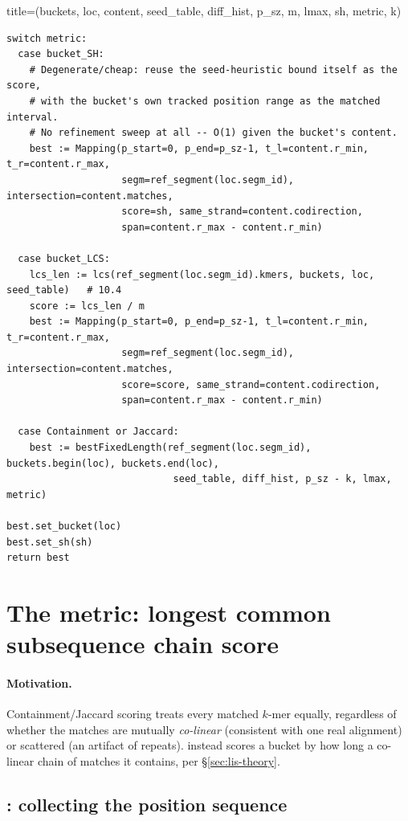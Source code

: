 \begin{algobox}{title={(buckets, loc, content, seed\_table, diff\_hist, p\_sz, m, lmax, sh, metric, k)}}
\begin{verbatim}
switch metric:
  case bucket_SH:
    # Degenerate/cheap: reuse the seed-heuristic bound itself as the score,
    # with the bucket's own tracked position range as the matched interval.
    # No refinement sweep at all -- O(1) given the bucket's content.
    best := Mapping(p_start=0, p_end=p_sz-1, t_l=content.r_min, t_r=content.r_max,
                    segm=ref_segment(loc.segm_id), intersection=content.matches,
                    score=sh, same_strand=content.codirection,
                    span=content.r_max - content.r_min)

  case bucket_LCS:
    lcs_len := lcs(ref_segment(loc.segm_id).kmers, buckets, loc, seed_table)   # 10.4
    score := lcs_len / m
    best := Mapping(p_start=0, p_end=p_sz-1, t_l=content.r_min, t_r=content.r_max,
                    segm=ref_segment(loc.segm_id), intersection=content.matches,
                    score=score, same_strand=content.codirection,
                    span=content.r_max - content.r_min)

  case Containment or Jaccard:
    best := bestFixedLength(ref_segment(loc.segm_id), buckets.begin(loc), buckets.end(loc),
                             seed_table, diff_hist, p_sz - k, lmax, metric)

best.set_bucket(loc)
best.set_sh(sh)
return best
\end{verbatim}
\end{algobox}

\section{The  metric: longest common subsequence chain score}
\label{sec:lcs-implementation}

\paragraph{Motivation.} Containment/Jaccard scoring treats every matched $k$-mer equally,
regardless of whether the matches are mutually \emph{co-linear} (consistent with one real
alignment) or scattered (an artifact of repeats).  instead scores a bucket by
how long a co-linear chain of matches it contains, per \S\ref{sec:lis-theory}.

\subsection{: collecting the position sequence}

